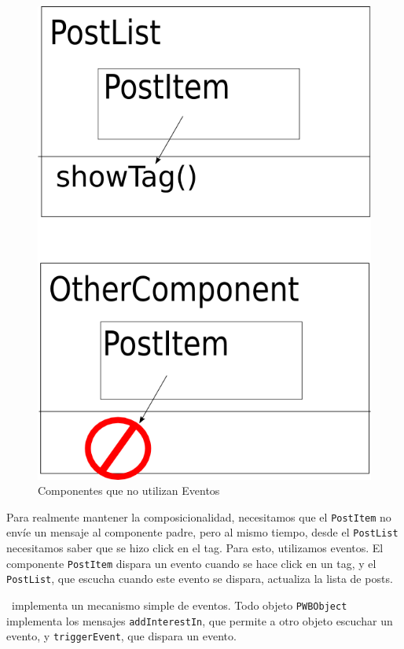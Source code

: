 \begin{figure}[h]
	\centering
	\includegraphics*[scale=0.30]{images/componentes.png}
 	\caption{Componentes que no utilizan Eventos}
 	\label{fig-comp1}
\end{figure}

Para realmente mantener la composicionalidad, necesitamos que el \verb"PostItem" no envíe un mensaje al componente padre, pero al mismo tiempo, desde el \verb'PostList' necesitamos saber que se hizo click en el tag. Para esto, utilizamos eventos. El componente \verb'PostItem' dispara un evento cuando se hace click en un tag, y el \verb'PostList', que escucha cuando este evento se dispara, actualiza la lista de posts.

\PWB\ implementa un mecanismo simple de eventos. Todo objeto \verb"PWBObject" implementa los mensajes \verb"addInterestIn", que permite a otro objeto escuchar un evento, y \verb"triggerEvent", que dispara un evento.

